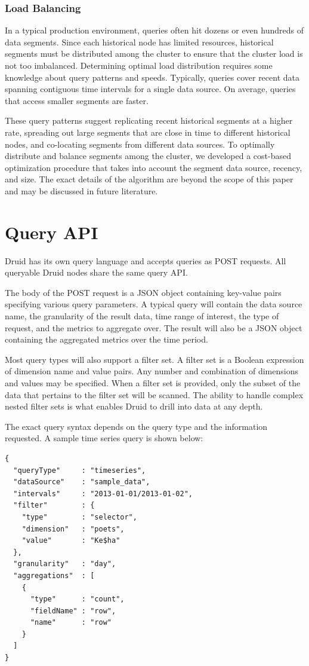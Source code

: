 \documentclass{vldb}
\begin{document}
\subsubsection{Load Balancing}
In a typical production environment, queries often hit dozens or even
hundreds of data segments. Since each historical node has limited
resources, historical segments must be distributed among the cluster
to ensure that the cluster load is not too imbalanced. Determining
optimal load distribution requires some knowledge about query patterns
and speeds. Typically, queries cover recent data spanning contiguous
time intervals for a single data source.  On average, queries that
access smaller segments are faster.

These query patterns suggest replicating recent historical segments at
a higher rate, spreading out large segments that are close in time to
different historical nodes, and co-locating segments from different data
sources.  To optimally distribute and balance segments among the
cluster, we developed a cost-based optimization procedure that takes
into account the segment data source, recency, and size. The exact
details of the algorithm are beyond the scope of this paper and may be discussed in future literature.

\section{Query API}
\label{sec:query-api}
Druid has its own query language and accepts queries as POST requests. All queryable
Druid nodes share the same query API.

The body of the POST request is
a JSON object containing key-value pairs specifying various query
parameters. A typical query will contain the data source name, the
granularity of the result data, time range of interest, the
type of request, and the metrics to aggregate over. The result will also be a JSON object
containing the aggregated metrics over the time period.

Most query types will also support a filter set. A filter set is a Boolean expression of dimension name and value
pairs. Any number and combination of dimensions and values may be specified.
When a filter set is provided, only the subset of the data that pertains to the filter set will be scanned.
The ability to handle complex nested filter sets is what enables Druid 
to drill into data at any depth.

The exact query syntax depends on the query type and the information requested.
A sample time series query is shown below:
\begin{verbatim}
{
  "queryType"     : "timeseries",
  "dataSource"    : "sample_data",
  "intervals"     : "2013-01-01/2013-01-02",
  "filter"        : {
    "type"        : "selector",
    "dimension"   : "poets",
    "value"       : "Ke$ha"
  },
  "granularity"   : "day",
  "aggregations"  : [
    {
      "type"      : "count",
      "fieldName" : "row",
      "name"      : "row"
    }
  ]
}
\end{verbatim}
\end{document}
